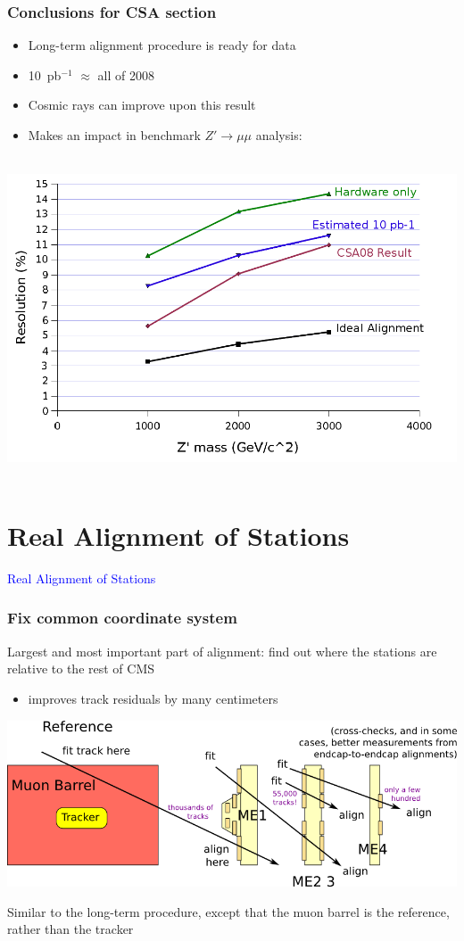 \documentclass[compress]{beamer}
\begin{document}
\begin{frame}
\frametitle{Conclusions for CSA section}

\vfill
\begin{itemize}\setlength{\itemsep}{0.2 cm}
\item Long-term alignment procedure is ready for data
\item 10~pb$^{-1}$ $\approx$ all of 2008
\item Cosmic rays can improve upon this result
\item Makes an impact in benchmark $Z' \to \mu\mu$ analysis:
\end{itemize}

\vfill
\mbox{ } \hfill \includegraphics[width=0.7\linewidth]{z-prime.png} \hfill \mbox{ }

\end{frame}

\section*{Real Alignment of Stations}
\begin{frame}
\begin{center}
\Huge \textcolor{blue}{Real Alignment of Stations}
\end{center}
\end{frame}

\begin{frame}
\frametitle{Fix common coordinate system}

Largest and most important part of alignment: find out where the
stations are relative to the rest of CMS

\begin{itemize}
\item improves track residuals by many centimeters
\end{itemize}

\vfill
\includegraphics[width=\linewidth]{fit_here_align_there.png}

\vfill
Similar to the long-term procedure, except that the muon barrel is the
reference, rather than the tracker
\end{frame}
\end{document}
